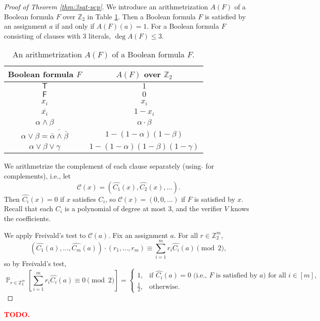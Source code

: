 \documentclass[letterpaper, reqno,11pt]{article}
\newcommand{\ZZ}{\mathbb{Z}}
\newcommand{\PP}{\mathop{{}\mathbb{P}}}
\DeclareMathOperator{\T}{\mathsf{T}}
\DeclareMathOperator{\F}{\mathsf{F}}
\begin{document}
\begin{proof}[Proof of Theorem \ref{thm:3sat-pcp}]
  We introduce an arithmetrization $A(F)$ of a Boolean formula $F$ over $\ZZ_2$ in Table \ref{tab:arithmetrization}. Then a Boolean formula $F$ is satisfied by an assignment $a$ if and only if $A(F)(a) = 1$. For a Boolean formula $F$ consisting of clauses with $3$ literals, $\deg A(F) \leq 3$.

  \begin{table}[h]
    \centering
    \begin{tabular}{c|c}
      Boolean formula $F$ & $A(F)$ over $\ZZ_2$ \\
      \hline \hline
      $\T$ & $1$ \\
      \hline
      $\F$ & $0$ \\
      \hline
      $x_i$ & $x_i$ \\
      \hline
      $\overline{x_i}$ & $1 - x_i$ \\
      \hline
      $\alpha \wedge \beta$ & $\alpha \cdot \beta$ \\
      \hline
      $\alpha \vee \beta = \overline{\bar \alpha \wedge \bar \beta}$ & $1 - (1 - \alpha) (1 - \beta)$ \\
      \hline
      $\alpha \vee \beta \vee \gamma$ & $1 - (1 - \alpha)(1 - \beta)(1 - \gamma)$
    \end{tabular}
    \caption{An arithmetrization $A(F)$ of a Boolean formula $F$.}
    \label{tab:arithmetrization}
  \end{table}

  We arithmetrize the complement of each clause separately (using $\hat{}$ for complements), i.e., let
  $$ \mathcal C(x) = \left(\widehat{C_1}(x), \widehat{C_2}(x), \ldots\right). $$
  Then $\widehat{C_i}(x) = 0$ if $x$ satisfies $C_i$, so $\mathcal C(x) = (0, 0, \ldots)$ if $F$ is satisfied by $x$. Recall that each $C_i$ is a polynomial of degree at most $3$, and the verifier $V$ knows the coefficients.

  We apply Freivald's test to $\mathcal C(a)$. Fix an assignment $a$. For all $r \in \ZZ_2^m$,
  $$ \left(\widehat{C_1}(a), \ldots, \widehat{C_m}(a)\right) \cdot \left(r_1, \ldots, r_m\right) \equiv \sum_{i = 1}^m r_i \widehat{C_i}(a) \pmod{2}, $$
  so by Freivald's test,
  $$ \PP_{r \in \ZZ_2^m}\left[\sum_{i = 1}^m r_i \widehat{C_i}(a) \equiv 0 \pmod{2}\right] = \left\{
    \begin{array}{ll}
      1, & \text{if $\widehat{C_i}(a) = 0$ (i.e., $F$ is satisfied by $a$) for all $i \in [m]$}, \\
      \frac{1}{2}, & \text{otherwise}.
    \end{array}
  \right. $$
\end{proof}

\textcolor{red}{\bf TODO.}
\end{document}
